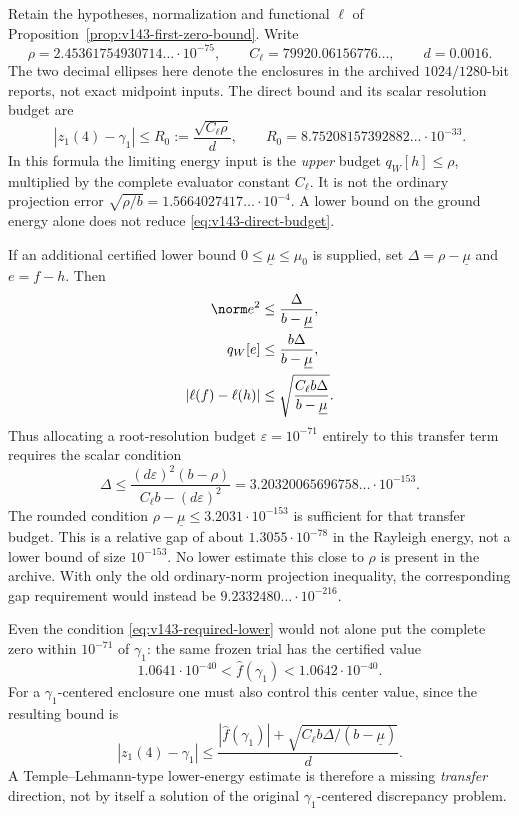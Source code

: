 \begin{proposition}
\label{prop:v143-resolution}
Retain the hypotheses, normalization and functional $\ell$ of
Proposition~\ref{prop:v143-first-zero-bound}. Write
\[
 \rho=2.45361754930714\ldots\cdot10^{-75},\qquad
 C_\ell=79920.06156776\ldots,\qquad d=0.0016.
\]
The two decimal ellipses here denote the enclosures in the archived
$1024/1280$-bit reports, not exact midpoint inputs.
The direct bound and its scalar resolution budget are
\begin{equation}\label{eq:v143-direct-budget}
 |z_1(4)-\gamma_1|\le R_0:=\frac{\sqrt{C_\ell\rho}}d,
 \qquad R_0=8.75208157392882\ldots\cdot10^{-33}.
\end{equation}
In this formula the limiting energy input is the \emph{upper} budget
$q_W[h]\le\rho$, multiplied by the complete evaluator constant
$C_\ell$. It is not the ordinary projection error
$\sqrt{\rho/b}=1.5664027417\ldots\cdot10^{-4}$.
A lower bound on the ground energy alone does not reduce
\eqref{eq:v143-direct-budget}.

If an additional certified lower bound $0\le\underline\mu\le\mu_0$
is supplied, set $\Delta=\rho-\underline\mu$ and $e=f-h$. Then
\begin{align}
 \norm e^2&\le\frac{\Delta}{b-\underline\mu},\label{eq:v143-lower-norm}\\
 q_W[e]&\le\frac{b\Delta}{b-\underline\mu},\label{eq:v143-lower-energy}\\
 |\ell(f)-\ell(h)|&\le
 \sqrt{\frac{C_\ell b\Delta}{b-\underline\mu}}.
 \label{eq:v143-lower-transfer}
\end{align}
Thus allocating a root-resolution budget $\varepsilon=10^{-71}$
entirely to this transfer term requires the scalar condition
\begin{equation}\label{eq:v143-required-lower}
 \Delta\le
 \frac{(d\varepsilon)^2(b-\rho)}{C_\ell b-(d\varepsilon)^2}
 =3.20320065696758\ldots\cdot10^{-153}.
\end{equation}
The rounded condition $\rho-\underline\mu\le3.2031\cdot10^{-153}$
is sufficient for that transfer budget. This is a relative gap of
about $1.3055\cdot10^{-78}$ in the Rayleigh energy, not a lower
bound of size $10^{-153}$. No lower estimate this close to $\rho$
is present in the archive. With only the old ordinary-norm projection
inequality, the corresponding gap requirement would instead be
$9.2332480\ldots\cdot10^{-216}$.

Even the condition \eqref{eq:v143-required-lower} would not alone
put the complete zero within $10^{-71}$ of $\gamma_1$: the same
frozen trial has the certified value
\[
 1.0641\cdot10^{-40}<\widehat f(\gamma_1)<1.0642\cdot10^{-40}.
\]
For a $\gamma_1$-centered enclosure one must also control this center
value, since the resulting bound is
\[
 |z_1(4)-\gamma_1|\le
 \frac{|\widehat f(\gamma_1)|+
       \sqrt{C_\ell b\Delta/(b-\underline\mu)}}d.
\]
A Temple--Lehmann-type lower-energy estimate is therefore a missing
\emph{transfer} direction, not by itself a solution of the original
$\gamma_1$-centered discrepancy problem.
\end{proposition}
